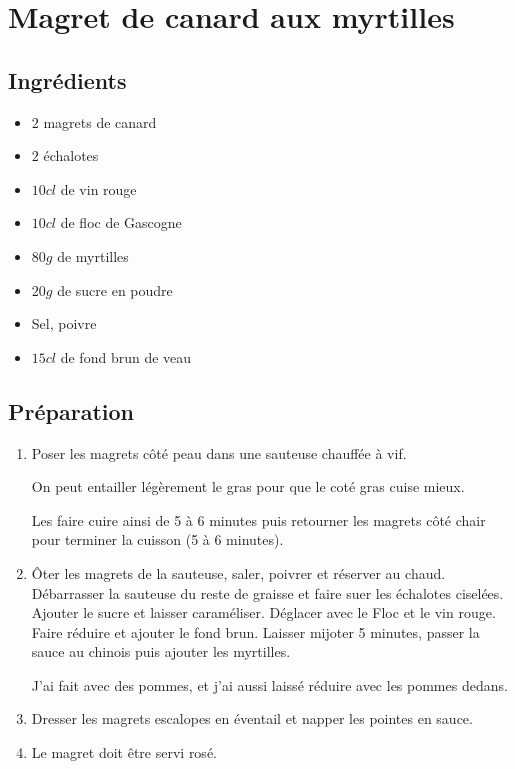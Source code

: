 \newpage
\section{Magret de canard aux myrtilles}
\subsection*{Ingrédients}
\begin{itemize}
\item $2$ magrets de canard
\item $2$ échalotes
\item  $10 \unit{cl}$ de vin rouge
\item  $10 \unit{cl}$ de floc de Gascogne
\item  $80 \unit{g}$ de myrtilles
\item  $20 \unit{g}$ de sucre en poudre
\item  Sel, poivre
\item  $15 \unit{cl}$ de fond brun de veau
\end{itemize}

\subsection*{Préparation}
\begin{enumerate}
\item Poser les magrets côté peau dans une sauteuse chauffée à vif.
\begin{remarque}
On peut entailler légèrement le gras pour que le coté gras cuise mieux.
\end{remarque}
Les faire cuire ainsi de 5 à 6 minutes puis retourner les magrets côté chair pour
terminer la cuisson (5 à 6 minutes).
\item Ôter les magrets de la sauteuse, saler, poivrer et réserver au chaud.
Débarrasser la sauteuse du reste de graisse et faire suer les échalotes
ciselées. Ajouter le sucre et laisser caraméliser. Déglacer avec le Floc
et le vin rouge. Faire réduire et ajouter le fond brun. Laisser mijoter
5 minutes, passer la sauce au chinois puis ajouter les myrtilles.
\begin{remarque}
J'ai fait avec des pommes, et j'ai aussi laissé réduire avec les pommes dedans.
\end{remarque}
\item Dresser les magrets escalopes en éventail et napper les pointes en sauce.
\item Le magret doit être servi rosé.
\end{enumerate}

